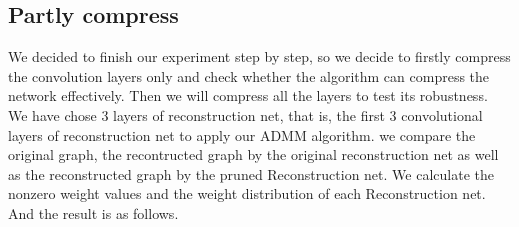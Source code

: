 \documentclass{acmtog} %
\begin{document}
\subsection{Partly compress}
\label{sec:experiments}
We decided to finish our experiment step by step, so we decide to firstly compress the convolution layers only and check whether the algorithm can compress the network effectively. Then we will compress all the layers to test its robustness.\\
We have chose 3 layers of reconstruction net, that is, the first 3 convolutional layers of reconstruction net to apply our ADMM algorithm. we compare the original graph, the recontructed graph by the original reconstruction net as well as the reconstructed graph by the pruned Reconstruction net. We calculate the nonzero weight values and the weight distribution of each Reconstruction net. And the result is as follows.
\end{document}
